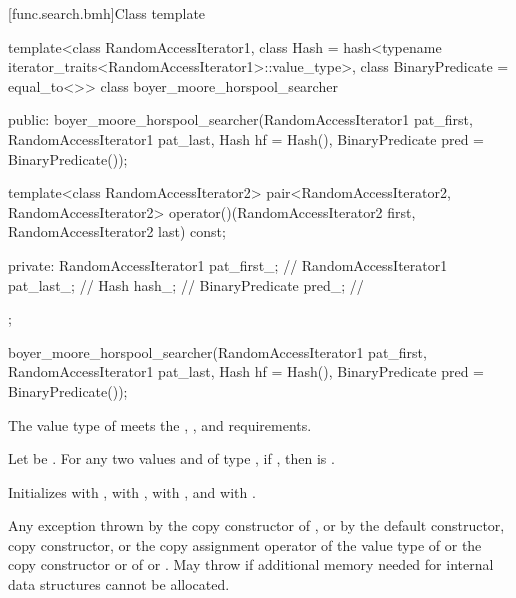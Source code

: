 [func.search.bmh]{Class template }

%
\begin{codeblock}
template<class RandomAccessIterator1,
         class Hash = hash<typename iterator_traits<RandomAccessIterator1>::value_type>,
         class BinaryPredicate = equal_to<>>
  class boyer_moore_horspool_searcher {
  public:
    boyer_moore_horspool_searcher(RandomAccessIterator1 pat_first,
                                  RandomAccessIterator1 pat_last,
                                  Hash hf = Hash(),
                                  BinaryPredicate pred = BinaryPredicate());

    template<class RandomAccessIterator2>
      pair<RandomAccessIterator2, RandomAccessIterator2>
        operator()(RandomAccessIterator2 first, RandomAccessIterator2 last) const;

  private:
    RandomAccessIterator1 pat_first_;   // \expos
    RandomAccessIterator1 pat_last_;    // \expos
    Hash hash_;                         // \expos
    BinaryPredicate pred_;              // \expos
  };
\end{codeblock}

%
\begin{itemdecl}
boyer_moore_horspool_searcher(RandomAccessIterator1 pat_first,
                              RandomAccessIterator1 pat_last,
                              Hash hf = Hash(),
                              BinaryPredicate pred = BinaryPredicate());
\end{itemdecl}

\begin{itemdescr}
\pnum
\expects
The value type of  meets the ,
, and  requirements.

\pnum
\expects
Let  be .
For any two values  and  of type ,
if , then  is .

\pnum
\effects
Initializes
 with ,
 with ,
 with , and
 with .

\pnum
\throws
Any exception thrown by the copy constructor of ,
or by the default constructor, copy constructor, or the copy assignment operator of the value type of 
or the copy constructor or  of  or .
May throw  if additional memory needed for internal data structures cannot be allocated.
\end{itemdescr}


